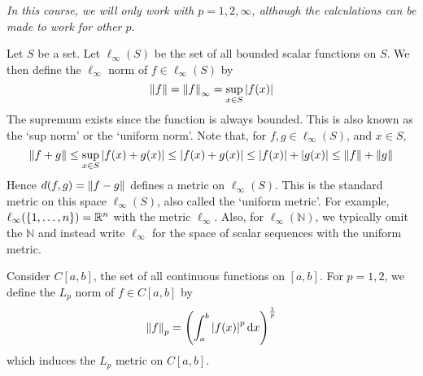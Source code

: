 \noindent \textit{In this course, we will only work with \( p = 1, 2, \infty \), although the calculations can be made to work for other \( p \).}
\begin{example}
Let \( S \) be a set.
Let \( \ell_\infty(S) \) be the set of all bounded scalar functions on \( S \).
We then define the \( \ell_\infty \) norm of \( f \in \ell_\infty(S) \) by
\[ \norm{f} = \norm{f}_\infty = \sup_{x \in S} \abs{f(x)} \]
The supremum exists since the function is always bounded.
This is also known as the `sup norm' or the `uniform norm'.
Note that, for \( f,g \in \ell_\infty(S) \), and \( x \in S \),
\[ \norm{f+g} \leq \sup_{x \in S} \abs{f(x) + g(x)} \leq \abs{f(x) + g(x)} \leq \abs{f(x)} + \abs{g(x)} \leq \norm{f} + \norm{g} \]
Hence \( d(f,g) =\norm{f-g} \) defines a metric on \( \ell_\infty(S) \).
This is the standard metric on this space \( \ell_\infty(S) \), also called the `uniform metric'.
For example, \( \ell_\infty(\qty{1, \dots, n}) = \mathbb R^n \) with the metric \( \ell_\infty \).
Also, for \( \ell_\infty(\mathbb N) \), we typically omit the \( \mathbb N \) and instead write \( \ell_\infty \) for the space of scalar sequences with the uniform metric.
\end{example}
\begin{example}
Consider \( C[a,b] \), the set of all continuous functions on \( [a,b] \).
For \( p = 1,2 \), we define the \( L_p \) norm of \( f \in C[a,b] \) by
\[ \norm{f}_p = \qty( \int_a^b \abs{f(x)}^p \dd{x} )^{\frac{1}{p}} \]
which induces the \( L_p \) metric on \( C[a,b] \).
\end{example}
